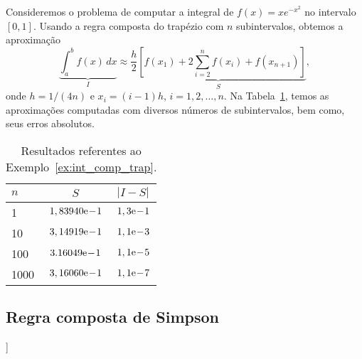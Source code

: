 \begin{ex}\label{ex:int_comp_trap}
  Consideremos o problema de computar a integral de $f(x)=xe^{-x^2}$ no intervalo $[0, 1]$. Usando a regra composta do trapézio com $n$ subintervalos, obtemos a aproximação
  \begin{equation}
    \underbrace{\int_a^b f(x)\,dx}_{I} \approx \underbrace{\frac{h}{2}\left[f(x_1) + 2\sum_{i=2}^{n} f(x_i) + f(x_{n+1})\right]}_{S},
  \end{equation}
onde $h=1/(4n)$ e $x_i = (i-1)h$, $i=1, 2, \dotsc, n$. Na Tabela~\ref{tab:ex_int_comp_trap}, temos as aproximações computadas com diversos números de subintervalos, bem como, seus erros absolutos.

\begin{table}[h!]
  \centering
  \caption{Resultados referentes ao Exemplo~\ref{ex:int_comp_trap}.}
  \begin{tabular}{l|cc}
    $n$ & $S$ & $|I-S|$ \\\hline
    1   & $1,83940\mathrm{e}\!-\!1$ & $1,3\mathrm{e}\!-\!1$ \\
    10  & $3,14919\mathrm{e}\!-\!1$ & $1,1\mathrm{e}\!-\!3$ \\
    100 & $3.16049\mathrm{e}\!-\!1$ & $1,1\mathrm{e}\!-\!5$ \\
    1000& $3,16060\mathrm{e}\!-\!1$ & $1,1\mathrm{e}\!-\!7$ \\\hline
  \end{tabular}
  \label{tab:ex_int_comp_trap}
\end{table}

\end{ex}

\subsection{Regra composta de Simpson}

\begin{flushleft}
  [[tag:revisar]]
\end{flushleft}

